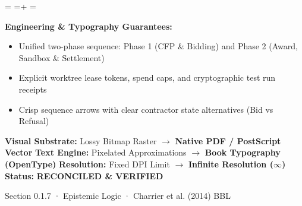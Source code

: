 \documentclass[10pt,a4paper,landscape]{article}
\newcommand{\pdautoscale}[2]{%
  \pdmaxh=#1\relax
  \pdmaxw=#2\relax
  \sbox{\pdscaledbox}{\usebox{\pdfigbox}}%
  \pdcurh=\dimexpr\ht\pdscaledbox+\dp\pdscaledbox\relax
  \pdcurw=\wd\pdscaledbox
  \ifdim\dimexpr\pdcurw * 100 / \pdmaxw\relax > \dimexpr\pdcurh * 100 / \pdmaxh\relax
    \resizebox{\pdmaxw}{!}{\usebox{\pdscaledbox}}%
  \else
    \resizebox{!}{\pdmaxh}{\usebox{\pdscaledbox}}%
  \fi
}
\begin{document}
\begin{minipage}[t]{0.492\linewidth}
  \begin{tcolorbox}[
    colback=pdcobalt!3,colframe=pdcobalt!85!black,arc=1.5pt,
    boxrule=0.7pt,top=1.5pt,bottom=1.5pt,left=4pt,right=4pt,
    title={\pdgrotesk\footnotesize\bfseries \color{white} B. Authoritative Native Vector Replacement \hfill \texttt{.tex / TikZ / PGF}}
  ]
    \begin{minipage}[c][8.3cm][c]{\linewidth}
      \centering
      \sbox{\pdfigbox}{}
      \pdautoscale{8.0cm}{\linewidth}
    \end{minipage}
    \tcblower
    \begin{minipage}[t][2.0cm][t]{\linewidth}
      \pdgrotesk\scriptsize
      \textbf{{\color{pdcobalt} Engineering \& Typography Guarantees:}}\\
      \begin{itemize}[leftmargin=9pt,itemsep=0pt,topsep=0.5pt,parsep=0pt]
        \item Unified two-phase sequence: Phase 1 (CFP \& Bidding) and Phase 2 (Award, Sandbox \& Settlement)
        \item Explicit worktree lease tokens, spend caps, and cryptographic test run receipts
        \item Crisp sequence arrows with clear contractor state alternatives (Bid vs Refusal)
      \end{itemize}
    \end{minipage}
  \end{tcolorbox}
\end{minipage}

\vspace*{0.05cm}
\noindent
\begin{tcolorbox}[
  colback=hhpaper,colframe=hhgray!35,arc=1.5pt,boxrule=0.4pt,
  top=1.5pt,bottom=1.5pt,left=6pt,right=6pt
]
  \pdgrotesk\scriptsize
  \noindent
  \textbf{Visual Substrate:} Lossy Bitmap Raster $\rightarrow$ \textbf{\color{pdcobalt}Native PDF / PostScript Vector}\hfill
  \textbf{Text Engine:} Pixelated Approximations $\rightarrow$ \textbf{\color{pdcobalt}Book Typography (OpenType)}\hfill
  \textbf{Resolution:} Fixed DPI Limit $\rightarrow$ \textbf{\color{pdcobalt}Infinite Resolution ($\infty$)}\hfill
  \textbf{Status:} \textbf{\color{pdteal}RECONCILED \& VERIFIED}
\end{tcolorbox}
\clearpage

\noindent
\begin{minipage}[t]{\linewidth}
  \hfill
  {\pdgrotesk\footnotesize\color{hhgray} Section 0.1.7 · Epistemic Logic · Charrier et al. (2014) BBL}\\
  \vspace*{0.03cm}
  \noindent{\color{hhgray!40}\rule{\linewidth}{0.5pt}}
\end{minipage}
\end{document}
